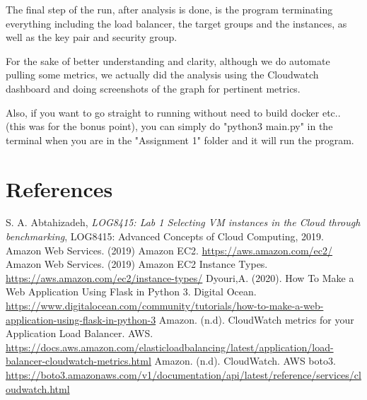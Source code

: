 \documentclass[12pt]{article}
\begin{document}
	\bigskip
	
	\noindent The final step of the run, after analysis is done, is the program terminating everything including the load balancer, the target groups and the instances, as well as the key pair and security group.
	
	\bigskip
	
    \noindent For the sake of better understanding and clarity, although we do automate pulling some metrics, we actually did the analysis using the Cloudwatch dashboard and doing screenshots of the graph for pertinent metrics.
    
    \bigskip
    
    \noindent Also, if you want to go straight to running without need to build docker etc.. (this was for the bonus point), you can simply do "python3 main.py" in the terminal when you are in the "Assignment 1" folder and it will run the program.
    
\pagebreak

\section{References} \label{sec:references}
	
	\begin{thebibliography} {}
		 S. A. Abtahizadeh, \emph{LOG8415: Lab 1 Selecting VM instances in the Cloud through benchmarking}, LOG8415: Advanced Concepts of Cloud Computing, 2019.
		 Amazon Web Services. (2019) Amazon EC2. \url{https://aws.amazon.com/ec2/}
		 Amazon Web Services. (2019) Amazon EC2 Instance Types. \url{https://aws.amazon.com/ec2/instance-types/}
		 Dyouri,A. (2020). How To Make a Web Application Using Flask in Python 3. Digital Ocean.  \url{https://www.digitalocean.com/community/tutorials/how-to-make-a-web-application-using-flask-in-python-3}
		 Amazon. (n.d). CloudWatch metrics for your Application Load Balancer. AWS. \url{https://docs.aws.amazon.com/elasticloadbalancing/latest/application/load-balancer-cloudwatch-metrics.html}
		 Amazon. (n.d). CloudWatch. AWS boto3. \url{https://boto3.amazonaws.com/v1/documentation/api/latest/reference/services/cloudwatch.html}
	\end{thebibliography}
\end{document}
